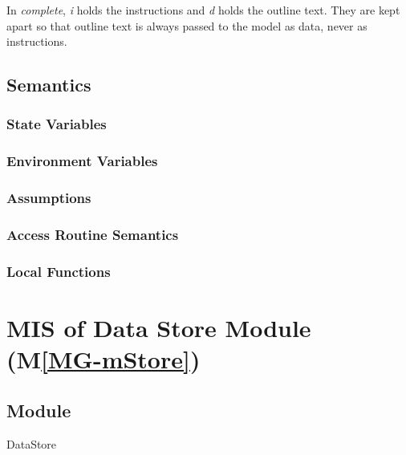\documentclass[12pt, titlepage]{article}
\newcommand{\mref}[1]{M\ref{MG-#1}}
\begin{document}
\noindent In \textit{complete}, \textit{i} holds the instructions and
\textit{d} holds the outline text. They are kept apart so that outline text is
always passed to the model as data, never as instructions.

\subsection{Semantics}

\subsubsection{State Variables}


\subsubsection{Environment Variables}


\subsubsection{Assumptions}

\subsubsection{Access Routine Semantics}

\subsubsection{Local Functions}

\newpage

\section{MIS of Data Store Module (\mref{mStore})} \label{mis-mStore}

\subsection{Module}

DataStore
\end{document}

